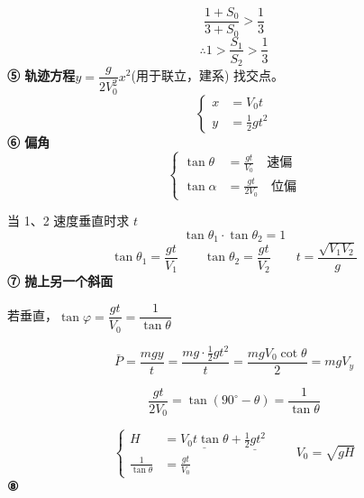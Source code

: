 \[
\frac{1+S_0}{3+S_0}>\frac13
\]
\[
\therefore 1>\frac{S_1}{S_2}>\frac13
\]%
\textbf{⑤ 轨迹方程}\quad $y=\dfrac{g}{2V_0^2}x^2$\quad (用于联立，建系) 找交点。
\[
\left\{\begin{aligned}x&=V_0t\\y&=\tfrac12gt^2\end{aligned}\right.
\]
\textbf{⑥ 偏角}
\[
\left\{\begin{aligned}
\tan\theta&=\frac{gt}{V_0}\quad\text{速偏}\\
\tan\alpha&=\frac{gt}{2V_0}\quad\text{位偏}
\end{aligned}\right.
\]

\noindent 当 1、2 速度垂直时求 $t$
\[
\tan\theta_1\cdot\tan\theta_2=1
\]
\[
\tan\theta_1=\frac{gt}{V_1}\qquad\tan\theta_2=\frac{gt}{V_2}\qquad t=\frac{\sqrt{V_1V_2}}{g}
\]
\textbf{⑦ 抛上另一个斜面}

\noindent 若垂直，$\tan\varphi=\dfrac{gt}{V_0}=\dfrac{1}{\tan\theta}$

\[
\bar P=\frac{mgy}{t}=\frac{mg\cdot\frac12gt^2}{t}=\frac{mgV_0\cot\theta}{2}=mgV_y
\]%

\[
\frac{gt}{2V_0}=\tan(90^\circ-\theta)=\frac{1}{\tan\theta}
\]

\[
\left\{\begin{aligned}
H&=\underline{V_0t\tan\theta}+\underline{\tfrac12gt^2}\\
\frac{1}{\tan\theta}&=\frac{gt}{V_0}
\end{aligned}\right.
\qquad V_0=\sqrt{gH}
\]%
\textbf{⑧}

